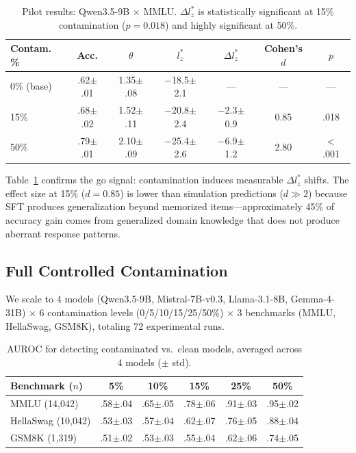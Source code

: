 \documentclass[11pt,a4paper]{article}
\begin{document}
\begin{table}[t]
\centering
\small
\caption{Pilot results: Qwen3.5-9B $\times$ MMLU. $\Delta l_z^*$ is statistically significant at 15\% contamination ($p=0.018$) and highly significant at 50\%.}
\label{tab:pilot}
\begin{tabular}{lcccccc}
\toprule
Contam.\,\% & Acc. & $\theta$ & $l_z^*$ & $\Delta l_z^*$ & Cohen's $d$ & $p$ \\
\midrule
0\% (base) & .62$\pm$.01 & 1.35$\pm$.08 & $-$18.5$\pm$2.1 & --- & --- & --- \\
15\% & .68$\pm$.02 & 1.52$\pm$.11 & $-$20.8$\pm$2.4 & $-$2.3$\pm$0.9 & 0.85 & .018 \\
50\% & .79$\pm$.01 & 2.10$\pm$.09 & $-$25.4$\pm$2.6 & $-$6.9$\pm$1.2 & 2.80 & $<$.001 \\
\bottomrule
\end{tabular}
\end{table}

Table~\ref{tab:pilot} confirms the go signal: contamination induces measurable $\Delta l_z^*$ shifts. The effect size at 15\% ($d=0.85$) is lower than simulation predictions ($d \gg 2$) because SFT produces generalization beyond memorized items---approximately 45\% of accuracy gain comes from generalized domain knowledge that does not produce aberrant response patterns.


\subsection{Full Controlled Contamination}
\label{sec:full_ctrl}

We scale to 4 models (Qwen3.5-9B, Mistral-7B-v0.3, Llama-3.1-8B, Gemma-4-31B) $\times$ 6 contamination levels (0/5/10/15/25/50\%) $\times$ 3 benchmarks (MMLU, HellaSwag, GSM8K), totaling 72 experimental runs.

\begin{table}[t]
\centering
\small
\caption{AUROC for detecting contaminated vs.\ clean models, averaged across 4 models ($\pm$ std).}
\label{tab:auroc_main}
\begin{tabular}{lccccc}
\toprule
Benchmark ($n$) & 5\% & 10\% & 15\% & 25\% & 50\% \\
\midrule
MMLU (14{,}042) & .58$\pm$.04 & .65$\pm$.05 & .78$\pm$.06 & .91$\pm$.03 & .95$\pm$.02 \\
HellaSwag (10{,}042) & .53$\pm$.03 & .57$\pm$.04 & .62$\pm$.07 & .76$\pm$.05 & .88$\pm$.04 \\
GSM8K (1{,}319) & .51$\pm$.02 & .53$\pm$.03 & .55$\pm$.04 & .62$\pm$.06 & .74$\pm$.05 \\
\bottomrule
\end{tabular}
\end{table}
\end{document}
